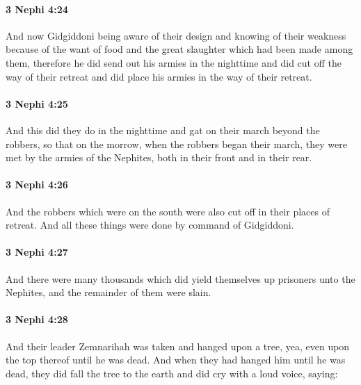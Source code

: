 		\paragraph{3 Nephi 4:24} %
			\label{3NEPHI-4-24}

			And now Gidgiddoni being aware of their design
			and knowing of their weakness because of the want of food
			and the great slaughter which had been made among them,
			therefore he did send out his armies in the nighttime
			and did cut off the way of their retreat
			and did place his armies in the way of their retreat.

		\paragraph{3 Nephi 4:25} %
			\label{3NEPHI-4-25}

			And this did they do in the nighttime
			and gat on their march beyond the robbers,
			so that on the morrow, when the robbers began their march,
			they were met by the armies of the Nephites,
			both in their front and in their rear.

		\paragraph{3 Nephi 4:26} %
			\label{3NEPHI-4-26}

			And the robbers which were on the south
			were also cut off in their places of retreat.
			And all these things were done by command of Gidgiddoni.

		\paragraph{3 Nephi 4:27} %
			\label{3NEPHI-4-27}

			And there were many thousands
			which did yield themselves up prisoners unto the Nephites,
			and the remainder of them were slain.

		\paragraph{3 Nephi 4:28} %
			\label{3NEPHI-4-28}

			And their leader Zemnarihah was taken and hanged upon a tree,
			yea, even upon the top thereof until he was dead.
			And when they had hanged him until he was dead,
			they did fall the tree to the earth
			and did cry with a loud voice, saying:


